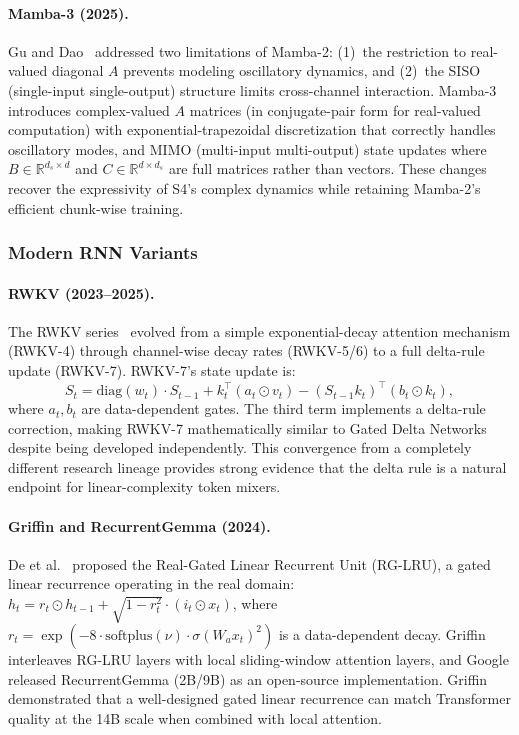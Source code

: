 \paragraph{Mamba-3 (2025).}
Gu and Dao~\cite{gu2025mamba3} addressed two limitations of Mamba-2: (1)~the restriction to real-valued diagonal $A$ prevents modeling oscillatory dynamics, and (2)~the SISO (single-input single-output) structure limits cross-channel interaction. Mamba-3 introduces complex-valued $A$ matrices (in conjugate-pair form for real-valued computation) with exponential-trapezoidal discretization that correctly handles oscillatory modes, and MIMO (multi-input multi-output) state updates where $B \in \mathbb{R}^{d_s \times d}$ and $C \in \mathbb{R}^{d \times d_s}$ are full matrices rather than vectors. These changes recover the expressivity of S4's complex dynamics while retaining Mamba-2's efficient chunk-wise training.

\subsubsection{Modern RNN Variants}

\paragraph{RWKV (2023--2025).}
The RWKV series~\cite{peng2023rwkv, peng2024eagle, peng2025rwkv7} evolved from a simple exponential-decay attention mechanism (RWKV-4) through channel-wise decay rates (RWKV-5/6) to a full delta-rule update (RWKV-7). RWKV-7's state update is:
\begin{equation}
S_t = \text{diag}(w_t) \cdot S_{t-1} + k_t^\top (a_t \odot v_t) - (S_{t-1} k_t)^\top (b_t \odot k_t),
\end{equation}
where $a_t, b_t$ are data-dependent gates. The third term implements a delta-rule correction, making RWKV-7 mathematically similar to Gated Delta Networks despite being developed independently. This convergence from a completely different research lineage provides strong evidence that the delta rule is a natural endpoint for linear-complexity token mixers.

\paragraph{Griffin and RecurrentGemma (2024).}
De et al.~\cite{de2024griffin} proposed the Real-Gated Linear Recurrent Unit (RG-LRU), a gated linear recurrence operating in the real domain: $h_t = r_t \odot h_{t-1} + \sqrt{1 - r_t^2} \cdot (i_t \odot x_t)$, where $r_t = \exp(-8 \cdot \text{softplus}(\nu) \cdot \sigma(W_a x_t)^2)$ is a data-dependent decay. Griffin interleaves RG-LRU layers with local sliding-window attention layers, and Google released RecurrentGemma (2B/9B) as an open-source implementation. Griffin demonstrated that a well-designed gated linear recurrence can match Transformer quality at the 14B scale when combined with local attention.

